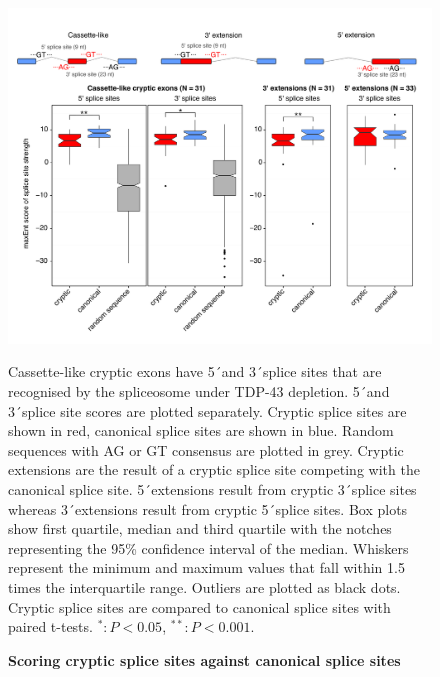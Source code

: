 \begin{figure}[h!]
	\centering
	\includegraphics[width=\textwidth]{Figures/03_cryptic_exons/Figure_6_splice_site_scoring.png}
	\caption{\textbf{Scoring cryptic splice sites against canonical splice sites}}
	Cassette-like cryptic exons have 5\'\ and 3\'\ splice sites that are recognised by the spliceosome under TDP-43 depletion. 5\'\ and 3\'\ splice site scores are plotted separately. Cryptic splice sites are shown in red, canonical splice sites are shown in blue. Random sequences with AG or GT consensus are plotted in grey. Cryptic extensions are the result of a cryptic splice site competing with the canonical splice site. 5\'\ extensions result from cryptic 3\'\ splice sites whereas 3\'\ extensions result from cryptic 5\'\ splice sites. Box plots show first quartile, median and third quartile with the notches representing the 95\% confidence interval of the median. Whiskers represent the minimum and maximum values that fall within 1.5 times the interquartile range. Outliers are plotted as black dots. Cryptic splice sites are compared to canonical splice sites with paired t-tests. $^{*}: P < 0.05$, $^{**}: P < 0.001$.
	\label{fig:cryptic_scoring}
\end{figure}

